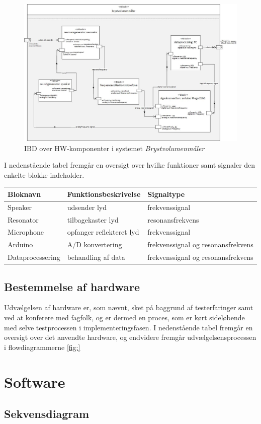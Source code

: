 \begin{figure}[htb]
\centering
\includegraphics[width=6in]{ibd.jpg}
\caption{IBD over HW-komponenter i systemet \textit{Brystvolumenmåler}}
\label{fig:ibd}
\end{figure}

I nedenstående tabel fremgår en oversigt over hvilke funktioner samt signaler den enkelte blokke indeholder. 

\begin{table}[htb]
\centering
\begin{tabular}{|l|l|l|}
\hline
\textbf{Bloknavn} & \textbf{Funktionsbeskrivelse} & \textbf{Signaltype}\\ \hline
Speaker & udsender lyd & frekvenssignal\\ \hline
Resonator & tilbagekaster lyd & resonansfrekvens\\ \hline
Microphone & opfanger reflekteret lyd & frekvenssignal \\ \hline
Arduino & A/D konvertering & frekvenssignal og resonansfrekvens \\ \hline
Dataprocessering & behandling af data & frekvenssignal og resonansfrekvens\\ \hline
\end{tabular}
\end{table}

\subsection{Bestemmelse af hardware} 
Udvælgelsen af hardware er, som nævnt, sket på baggrund af testerfaringer samt ved at konferere med fagfolk, og er dermed en proces, som er kørt sideløbende med selve testprocessen i implementeringsfasen. 
I nedenstående tabel fremgår en oversigt over det anvendte hardware, og endvidere fremgår udvælgelsensprocessen i flowdiagrammerne \ref{fig:}





\section{Software}

\subsection{Sekvensdiagram}

